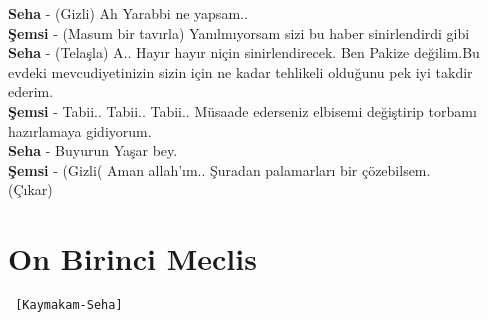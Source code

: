 \documentclass[]{book}
\begin{document}
\textbf{Seha} - (Gizli) Ah Yarabbi ne yapsam..\\
\textbf{Şemsi} - (Masum bir tavırla) Yanılmıyorsam sizi bu haber sinirlendirdi gibi\\
\textbf{Seha} - (Telaşla) A.. Hayır hayır niçin sinirlendirecek. Ben Pakize değilim.Bu evdeki mevcudiyetinizin sizin için ne kadar tehlikeli olduğunu pek iyi takdir ederim.\\
\textbf{Şemsi} - Tabii.. Tabii.. Tabii.. Müsaade ederseniz elbisemi değiştirip torbamı hazırlamaya gidiyorum.\\
\textbf{Seha} - Buyurun Yaşar bey.\\
\textbf{Şemsi} - (Gizli( Aman allah'ım.. Şuradan palamarları bir çözebilsem.\\
(Çıkar)

\hypertarget{on-birinci-meclis}{%
\section{On Birinci Meclis}\label{on-birinci-meclis}}

\begin{verbatim}
 [Kaymakam-Seha]
\end{verbatim}
\end{document}
